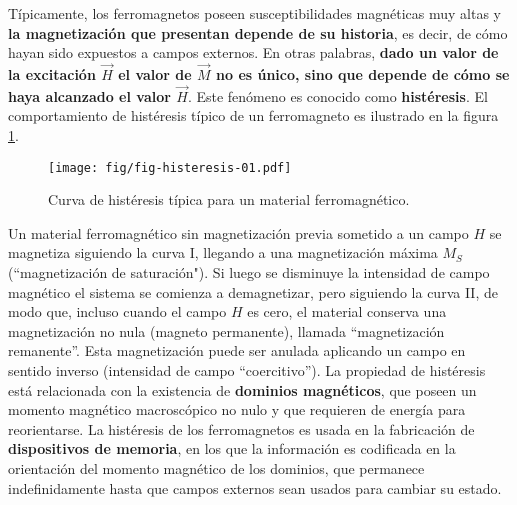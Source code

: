 Típicamente, los ferromagnetos poseen susceptibilidades
magnéticas muy altas y \textbf{la magnetización que presentan depende de
su historia}, es decir, de cómo hayan sido expuestos a campos externos. En
otras palabras, \textbf{dado un valor de la excitación $\vec{H}$ el valor de $\vec{M}$
no es único, sino que depende de cómo se haya alcanzado el valor $\vec{H}$}.
Este fenómeno es conocido como \textbf{histéresis}. El comportamiento de
histéresis típico de un ferromagneto es ilustrado en la figura
\ref{fig-histeresis}.
\begin{figure}[!h]
\centerline{\texttt{[image: fig/fig-histeresis-01.pdf]}}
\caption{Curva de histéresis típica para un material ferromagnético.}
\label{fig-histeresis}
\end{figure}
Un material ferromagnético sin magnetización previa sometido a un campo $H$
se magnetiza siguiendo la curva I, llegando a una magnetización máxima $M_S$ (``magnetización de saturación"). 
Si luego se disminuye la intensidad de campo magnético el sistema se comienza
a demagnetizar, pero siguiendo la curva II, de modo que, incluso cuando el
campo $H$ es cero, el material conserva una magnetización no nula (magneto
permanente), llamada ``magnetización remanente''. Esta magnetización puede
ser anulada aplicando un campo en sentido inverso (intensidad de campo
``coercitivo''). La propiedad de histéresis está relacionada con la existencia
de \textbf{dominios magnéticos}, que poseen un momento magnético macroscópico
no nulo y que requieren de energía para reorientarse. La histéresis de los
ferromagnetos es usada en la fabricación de \textbf{dispositivos de memoria}, en los
que la información es codificada en la orientación del momento magnético de
los dominios, que permanece indefinidamente hasta que campos externos sean
usados para cambiar su estado.
